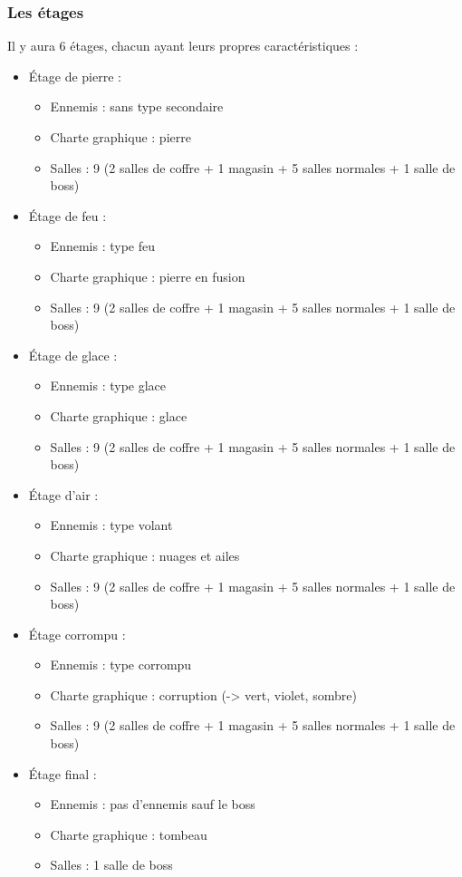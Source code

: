 \documentclass[]{extarticle}
\begin{document}
		\subsubsection{Les étages}
\bigbreak
\bigbreak
Il y aura 6 étages, chacun ayant leurs propres caractéristiques :
\bigbreak
\begin{itemize}
\item Étage de pierre :
\begin{itemize}
\item Ennemis : sans type secondaire
\item Charte graphique : pierre
\item Salles : 9 (2 salles de coffre + 1 magasin + 5 salles normales + 1 salle de boss)
\end{itemize}
\bigbreak
\item Étage de feu :
\begin{itemize}
\item Ennemis : type feu
\item Charte graphique : pierre en fusion
\item Salles : 9 (2 salles de coffre + 1 magasin + 5 salles normales + 1 salle de boss)
\end{itemize}
\bigbreak
\item Étage de glace :
\begin{itemize}
\item Ennemis : type glace
\item Charte graphique : glace
\item Salles : 9 (2 salles de coffre + 1 magasin + 5 salles normales + 1 salle de boss)
\end{itemize}
\bigbreak
\item Étage d’air :
\begin{itemize}
\item Ennemis : type volant
\item Charte graphique : nuages et ailes
\item Salles : 9 (2 salles de coffre + 1 magasin + 5 salles normales + 1 salle de boss)
\end{itemize}
\bigbreak
\item Étage corrompu :
\begin{itemize}
\item Ennemis : type corrompu
\item Charte graphique : corruption (-> vert, violet, sombre)
\item Salles : 9 (2 salles de coffre + 1 magasin + 5 salles normales + 1 salle de boss)
\end{itemize}
\bigbreak
\item Étage final :
\begin{itemize}
\item Ennemis : pas d’ennemis sauf le boss
\item Charte graphique : tombeau
\item Salles : 1 salle de boss
\end{itemize}
\end{itemize}
\end{document}

